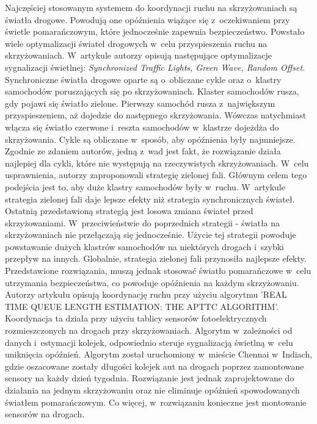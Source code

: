 \indent
Najczęściej stosowanym systemem do koordynacji ruchu na skrzyżowaniach są światła drogowe. Powodują one opóźnienia wiążące się z~oczekiwaniem przy świetle pomarańczowym, które jednocześnie zapewnia bezpieczeństwo. Powstało wiele optymalizacji świateł drogowych w~celu przyspieszenia ruchu na skrzyżowaniach.
\newline
\indent
W~artykule \cite{brockfeld2001optimizing} autorzy opisują następujące optymalizacje sygnalizacji świetlnej: \textit{Synchronized Traffic Lights, Green Wave, Random Offset}. Synchroniczne światła drogowe oparte są o~obliczane cykle oraz o~klastry samochodów poruszających się po skrzyżowaniach. Klaster samochodów rusza, gdy pojawi się światło zielone. Pierwszy samochód rusza z~największym przyspieszeniem, aż dojedzie do następnego skrzyżowania. Wówczas natychmiast włącza się światło czerwone i~reszta samochodów w~klastrze dojeżdża do skrzyżowania. Cykle są obliczane w~sposób, aby opóźnienia były najmniejsze. Zgodnie ze zdaniem autorów, jedną z~wad jest fakt, że rozwiązanie działa najlepiej dla cykli, które nie występują na rzeczywistych skrzyżowaniach. W~celu usprawnienia, autorzy zaproponowali strategię zielonej fali. Głównym celem tego podejścia jest to, aby duże klastry samochodów były w~ruchu. W~artykule strategia zielonej fali daje lepsze efekty niż strategia synchronicznych świateł. Ostatnią przedstawioną strategią jest losowa zmiana świateł przed skrzyżowaniami. W~przeciwieństwie do poprzednich strategii - światła na skrzyżowaniach nie przełączają się jednocześnie. Użycie tej strategii powoduje powstawanie dużych klastrów samochodów na niektórych drogach i~szybki przepływ na innych. Globalnie, strategia zielonej fali przynosiła najlepsze efekty. Przedstawione rozwiązania, muszą jednak stosować światło pomarańczowe w~celu utrzymania bezpieczeństwa, co powoduje opóźnienia na każdym skrzyżowaniu.
\newline
\indent
Autorzy artykułu \cite{athmaraman2005adaptive} opisują koordynację ruchu przy użyciu algorytmu 'REAL TIME QUEUE LENGTH ESTIMATION: THE APTTC ALGORITHM'. Koordynacja ta działa przy użyciu tablicy sensorów fotoelektrycznych rozmieszczonych na drogach przy skrzyżowaniach. Algorytm w~zależności od danych i~estymacji kolejek, odpowiednio steruje sygnalizacją świetlną w~celu uniknięcia opóźnień. Algorytm został uruchomiony w~mieście Chennai w~Indiach, gdzie oszacowane zostały długości kolejek aut na drogach poprzez zamontowane sensory na każdy dzień tygodnia. Rozwiązanie jest jednak zaprojektowane do działania na jednym skrzyżowaniu oraz nie eliminuje opóźnień spowodowanych światłem pomarańczowym. Co więcej, w~rozwiązaniu konieczne jest montowanie sensorów na drogach.
